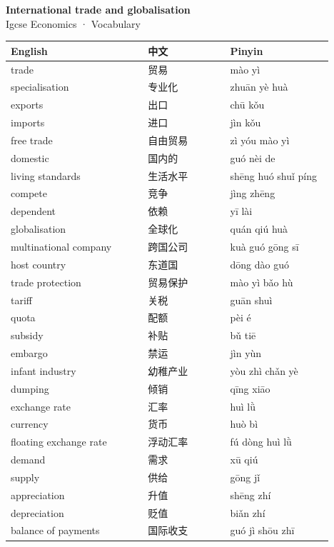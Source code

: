 \documentclass[11pt]{article}
\begin{document}
\begin{center}
  {\LARGE\bfseries International trade and globalisation}\\[0.35em]
  {\large Igcse Economics · Vocabulary}
\end{center}
\vspace{0.6em}

\begin{longtable}{@{}p{0.40\linewidth}p{0.24\linewidth}p{0.30\linewidth}@{}}
\toprule
\textbf{English} & \textbf{中文} & \textbf{Pinyin} \\
\midrule
\endhead
\bottomrule
\endlastfoot
trade & 贸易 & mào yì \\
specialisation & 专业化 & zhuān yè huà \\
exports & 出口 & chū kǒu \\
imports & 进口 & jìn kǒu \\
free trade & 自由贸易 & zì yóu mào yì \\
domestic & 国内的 & guó nèi de \\
living standards & 生活水平 & shēng huó shuǐ píng \\
compete & 竞争 & jìng zhēng \\
dependent & 依赖 & yī lài \\
globalisation & 全球化 & quán qiú huà \\
multinational company & 跨国公司 & kuà guó gōng sī \\
host country & 东道国 & dōng dào guó \\
trade protection & 贸易保护 & mào yì bǎo hù \\
tariff & 关税 & guān shuì \\
quota & 配额 & pèi é \\
subsidy & 补贴 & bǔ tiē \\
embargo & 禁运 & jìn yùn \\
infant industry & 幼稚产业 & yòu zhì chǎn yè \\
dumping & 倾销 & qīng xiāo \\
exchange rate & 汇率 & huì lǜ \\
currency & 货币 & huò bì \\
floating exchange rate & 浮动汇率 & fú dòng huì lǜ \\
demand & 需求 & xū qiú \\
supply & 供给 & gōng jǐ \\
appreciation & 升值 & shēng zhí \\
depreciation & 贬值 & biǎn zhí \\
balance of payments & 国际收支 & guó jì shōu zhī \\

\end{longtable}
\end{document}
